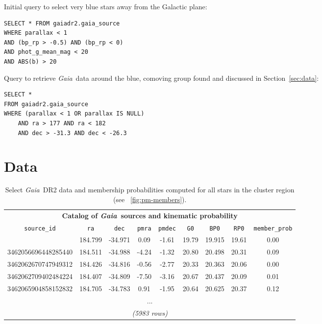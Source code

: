 \documentclass[twocolumn]{aastex62}
\newcommand{\acronym}[1]{{\small{#1}}}
\newcommand{\gaia}{\textsl{Gaia}}
\newcommand{\DR}[1]{\acronym{DR#1}}
\newcommand{\sectionname}{Section}
\begin{document}
Initial query to select very blue stars away from the Galactic plane:
\begin{verbatim}
SELECT * FROM gaiadr2.gaia_source
WHERE parallax < 1
AND (bp_rp > -0.5) AND (bp_rp < 0)
AND phot_g_mean_mag < 20
AND ABS(b) > 20
\end{verbatim}

Query to retrieve \gaia\ data around the blue, comoving group found and discussed in \sectionname~\ref{sec:data}:
\begin{verbatim}
SELECT *
FROM gaiadr2.gaia_source
WHERE (parallax < 1 OR parallax IS NULL)
    AND ra > 177 AND ra < 182
    AND dec > -31.3 AND dec < -26.3
\end{verbatim}

\section{Data}
\label{sec:datatables}

\begin{table}[h!]
    \centering
    \begin{tabular}{c | c | c | c | c | c | c | c | c}
        \multicolumn{9}{c}{\textbf{Catalog of \gaia\ sources and kinematic probability}}\\
        \texttt{source\_id} & \texttt{ra} & \texttt{dec} & \texttt{pmra} & \texttt{pmdec} & \texttt{G0} & \texttt{BP0} & \texttt{RP0} & \texttt{member\_prob} \\
        \tableline
        3462048793708019200 & 184.799 & -34.971 &  0.09 & -1.61 & 19.79 & 19.915 & 19.61 & 0.00 \\
        3462056696448285440 & 184.511 & -34.988 & -4.24 & -1.32 & 20.80 & 20.498 & 20.31 & 0.09 \\
        3462062670747949312 & 184.426 & -34.816 & -0.56 & -2.77 & 20.33 & 20.363 & 20.06 & 0.00 \\
        3462062709402484224 & 184.407 & -34.809 & -7.50 & -3.16 & 20.67 & 20.437 & 20.09 & 0.01 \\
        3462065904858152832 & 184.705 & -34.783 &  0.91 & -1.95 & 20.64 & 20.625 & 20.37 & 0.12 \\
        \multicolumn{9}{c}{...}\\
        \multicolumn{9}{c}{\textit{(5983 rows)}}
    \end{tabular}
    \caption{Select \gaia\ \DR{2} data and membership probabilities computed for all stars in the cluster region (see \figurename~\ref{fig:pm-members}).}
    \label{tbl:gaiadata}
\end{table}
\end{document}
